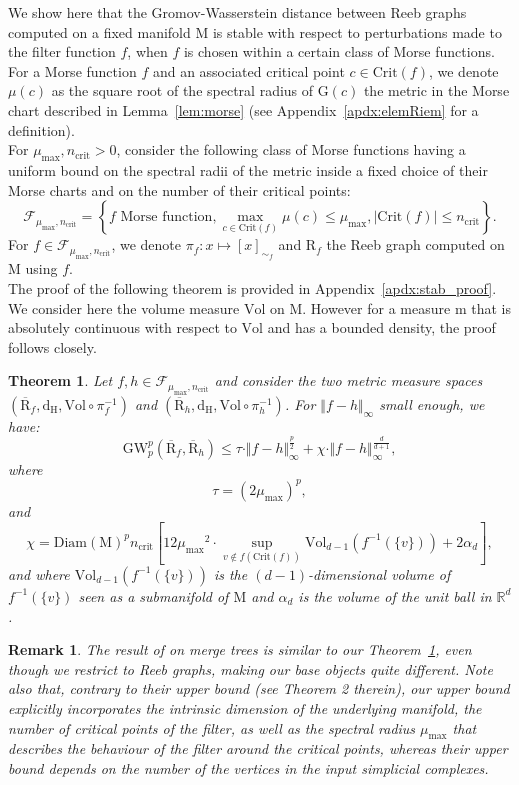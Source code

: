 \documentclass[pdflatex,sn-mathphys-ay]{sn-jnl}%
\newtheorem{theorem}{Theorem}[section]
\newtheorem{remark}{Remark}
\newcommand{\reeb}{\mathrm{R}}
\newcommand{\man}{\mathrm{M}}
\newcommand{\mes}{\mathrm{m}}
\newcommand{\gromov}{\mathrm{GW}}
\newcommand{\critic}{{\mathrm {Crit}}}
\newcommand{\haus}{{\mathrm {d_H}}}
\newcommand{\diam}{\mathrm{Diam}}
\newcommand{\vol}{\mathrm{Vol}}
\newcommand{\G}{\mathrm{G}}
\newcommand{\R}{\mathbb{R}}
\newcommand{\preim}[2]{#1^{-1}(#2)}
\newcommand{\mub}{{\mu_{\text{max}}}}
\newcommand{\crib}{{n_{\text{crit}}}}
\newcommand{\class}{\mathcal{F}_{\mub,\crib}}
\newcommand{\inorm}[1]{\Vert #1\Vert_\infty}
\newcommand{\cnorm}[1]{\Vert #1\Vert_{C^1}}
\newcommand{\change}[1]{\noindent #1}
\newcommand{\ff}{h}
\theoremstyle{thmstyleone}%
\begin{document}
We show here that the Gromov-Wasserstein distance between Reeb graphs computed on a fixed manifold $\man$ is stable with respect to perturbations made to the filter function $f$, when $f$ is chosen within a certain class of Morse functions.\\
For a Morse function $f$ and an associated critical point $c\in\critic(f)$, we denote $\mu(c)$ as the square root of the spectral radius of $\G(c)$ the metric in the Morse chart described in Lemma~\ref{lem:morse} (see Appendix~\ref{apdx:elemRiem} for a definition).\\
For $\mub,\crib>0$, consider the following class of Morse functions having a uniform bound on the spectral radii of the metric inside a fixed choice of their Morse charts and on the number of their critical points:
$$\class=\left\{f \text{ Morse function},\max_{c\in\critic(f)}\mu(c)\leq\mub, \left|\critic(f)\right|\leq \crib \right\}.$$ 
For $f\in\class$, we denote $\pi_f\colon x\mapsto[x]_{\sim_f}$ and $\reeb_f$ the Reeb graph computed on $\man$ using $f$. \\


The proof of the following \change{theorem} is provided in Appendix~\ref{apdx:stab_proof}. We consider here the volume measure $\vol$ on $\man$. However for a measure $\mes$ that is absolutely continuous with respect to $\vol$ and has a bounded density, the proof follows closely.

\begin{theorem}\label{thm:stability}
Let $f,\ff\in\class$ and consider the two metric measure spaces $\left(\overline{\reeb}_f,\haus,\vol\circ\pi_f^{-1}\right)$ and $\left(\overline{\reeb}_\ff,\haus,\vol\circ\pi_\ff^{-1}\right)$. For $\inorm{f-\ff}$ small enough, we have:
$$\gromov_p^p(\overline{\reeb}_f,\overline{\reeb}_\ff)\leq \tau\cdot\inorm{f-\ff}^{\frac{p}{2}}+\chi\cdot \inorm{f-\ff}^{\frac{d}{d+1}},$$
where
$$\tau=(2\mub)^p,$$
and 
$$\chi=\diam(\man)^p\crib\left[12\mub^2\cdot\sup_{v\notin f(\critic(f))}\vol_{d-1}\left(\preim{f}{\{v\}}\right)+2\alpha_d\right],$$
and where $\vol_{d-1}\left(\preim{f}{\{v\}}\right)$ is the $(d-1)$-dimensional volume of $\preim{f}{\{v\}}$ seen as a submanifold of $\man$ and $\alpha_d$ is the volume of the unit ball in $\R^d$.
\end{theorem}


\begin{remark}
The result of \citet{liFlexibleProbabilisticTopology2025} on merge trees is similar to our Theorem~\ref{thm:stability}, even though we restrict to Reeb graphs, making our base objects quite different. Note also that, contrary to their upper bound (see Theorem 2 therein), our upper bound explicitly incorporates the intrinsic dimension of the underlying manifold, the number of critical points of the filter, as well as the spectral radius $\mub$ that describes the behaviour of the filter around the critical points, whereas their upper bound depends on the number of the vertices in the input simplicial complexes.
\end{remark}
\end{document}
